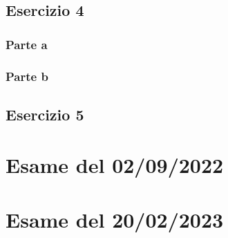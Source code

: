 \documentclass[a4paper]{article}
\begin{document}
	\subsection{Esercizio 4}

	\subsubsection{Parte a}

	\subsubsection{Parte b}

	\subsection{Esercizio 5}
	
	\newpage
	\section{Esame del 02/09/2022}
	
	\newpage
	\section{Esame del 20/02/2023}
\end{document}
